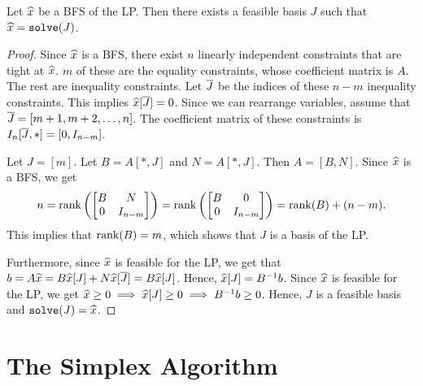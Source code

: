\begin{lemma}
\label{thm:bfs-gives-basis}
Let $\widehat{x}$ be a BFS of the LP. Then there exists a feasible basis $J$
such that $\widehat{x} = \operatorname{\mathtt{solve}}(J)$.
\end{lemma}
\begin{proof}
Since $\widehat{x}$ is a BFS, there exist $n$ linearly independent constraints that are tight at $\widehat{x}$.
$m$ of these are the equality constraints, whose coefficient matrix is $A$.
The rest are inequality constraints.
Let $\overline{J}$ be the indices of these $n-m$ inequality constraints.
This implies $\widehat{x}[\overline{J}] = 0$.
Since we can rearrange variables, assume \wLoG{} that $\overline{J} = [m+1, m+2, \ldots, n]$.
The coefficient matrix of these constraints is $I_n[\overline{J},*] = [0, I_{n-m}]$.

Let $J = [m]$. Let $B = A[*,J]$ and $N = A[*,J]$. Then $A = [B, N]$. Since $\widehat{x}$ is a BFS, we get
\[ n = \operatorname{rank}\left(\begin{bmatrix}B & N \\ 0 & I_{n-m}\end{bmatrix}\right)
= \operatorname{rank}\left(\begin{bmatrix}B & 0 \\ 0 & I_{n-m}\end{bmatrix}\right)
= \operatorname{rank}(B) + (n-m). \]
This implies that $\operatorname{rank}(B) = m$, which shows that $J$ is a basis of the LP.

Furthermore, since $\widehat{x}$ is feasible for the LP, we get that
$b = A\widehat{x} = B\widehat{x}[J] + N\widehat{x}[\overline{J}] = B\widehat{x}[J]$.
Hence, $\widehat{x}[J] = B^{-1}b$. Since $\widehat{x}$ is feasible for the LP,
we get $\widehat{x} \ge 0 \implies \widehat{x}[J] \ge 0 \implies B^{-1}b \ge 0$.
Hence, $J$ is a feasible basis and $\operatorname{\mathtt{solve}}(J) = \widehat{x}$.
\end{proof}

\section{The Simplex Algorithm}

